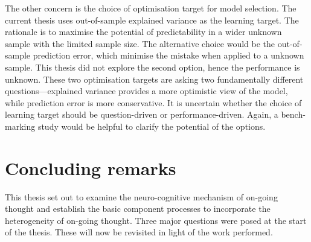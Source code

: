 The other concern is the choice of optimisation target for model selection. The current thesis uses out-of-sample explained variance as the learning target. The rationale is to maximise the potential of predictability in a wider unknown sample with the limited sample size. The alternative choice would be the out-of-sample prediction error, which minimise the mistake when applied to a unknown sample. This thesis did not explore the second option, hence the performance is unknown. These two optimisation targets are asking two fundamentally different questions---explained variance provides a more optimistic view of the model, while prediction error is more conservative. It is uncertain whether the choice of learning target should be question-driven or performance-driven. Again, a bench-marking study would be helpful to clarify the potential of the options. 




\section{Concluding remarks}
\label{ch:discussion:summary}

This thesis set out to examine the neuro-cognitive mechanism of on-going thought and establish the basic component processes to incorporate the heterogeneity of on-going thought. Three major questions were posed at the start of the thesis. These will now be revisited in light of the work performed.

